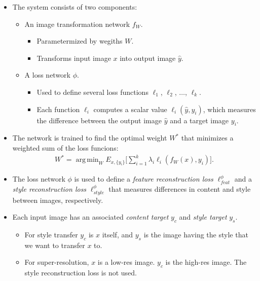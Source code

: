 \documentclass[10pt]{article}
\DeclareMathOperator*{\argmin}{arg\,min}
\begin{document}
  \begin{itemize}
  	\item The system consists of two components:
  	\begin{itemize}
  		\item An image transformation network $f_W$.
  		\begin{itemize}
  			\item Parametermized by wegiths $W$.
  			\item Transforms input image $x$ into output image $\hat{y}$.
  		\end{itemize}
  		\item A loss network $\phi$.
  		\begin{itemize}
  		 	\item Used to define several loss functions $\ell_1$, $\ell_2$, $\dotsc$, $\ell_k$.
  		 	\item Each function $\ell_i$ computes a scalar value $\ell_i(\hat{y},y_i)$, which measures the difference between the output image $\hat{y}$ and a target image $y_i$.
  		\end{itemize} 
  	\end{itemize}

  	\item The network is trained to find the optimal weight $W^*$ that minimizes a weighted sum of the loss funcions:
  	\begin{align*}
  		W^* = \argmin_{W} E_{x, \{y_i\}} \bigg[ \sum_{i=1}^k \lambda_i \ell_i (f_W(x), y_i) \bigg].
  	\end{align*}

  	\item The loss network $\phi$ is used to define a \emph{feature reconstruction loss} $\ell^\phi_{feat}$ and a \emph{style reconstruction loss} $\ell^\phi_{style}$ that measures differences in content and style between images, respectively.

  	\item Each input image has an associated \emph{content target} $y_c$ and \emph{style target} $y_s$.
  	\begin{itemize}
  		\item For style transfer $y_c$ is $x$ itself, and $y_s$ is the image having the style that we want to transfer $x$ to.
  		\item For super-resolution, $x$ is a low-res image. $y_c$ is the high-res image. The style reconstruction loss is not used.
  	\end{itemize}
  \end{itemize}
\end{document}
